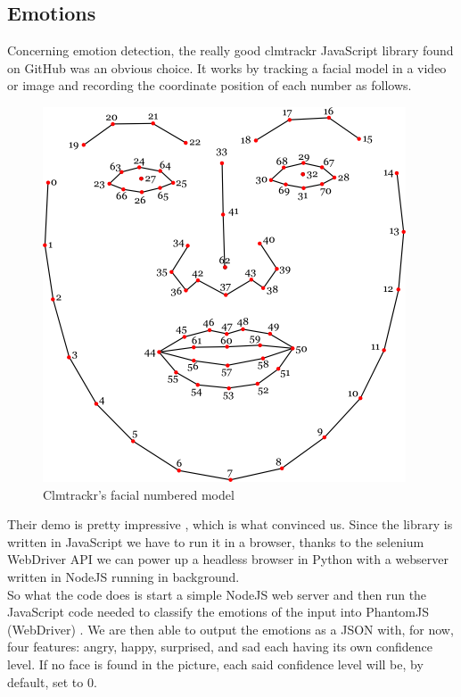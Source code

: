 \documentclass{article}
\begin{document}
    \subsection{Emotions}
        Concerning emotion detection, the really good clmtrackr JavaScript library found on GitHub \cite{clm} was an obvious choice. It works by tracking a facial model in a video or image and recording the coordinate position of each number as follows. 
        \begin{figure}[h]
            \centering
            \includegraphics[scale=0.7]{clm.png}
            \caption{Clmtrackr's facial numbered model}
        \end{figure}
        \newpage
        Their demo is pretty impressive \cite{clmdemo}, which is what convinced us. Since the library is written in JavaScript we have to run it in a browser, thanks to the selenium WebDriver API \cite{web} we can power up a headless browser in Python with a webserver written in NodeJS \cite{node} running in background.
        \\So what the code does is start a simple NodeJS web server and then run the JavaScript  code needed to classify the emotions of the input into PhantomJS (WebDriver) \cite{phan}. We are then able to output the emotions as a JSON with, for now, four features: angry, happy, surprised, and sad each having its own confidence level. If no face is found in the picture, each said confidence level will be, by default, set to 0.

\newpage
\end{document}
